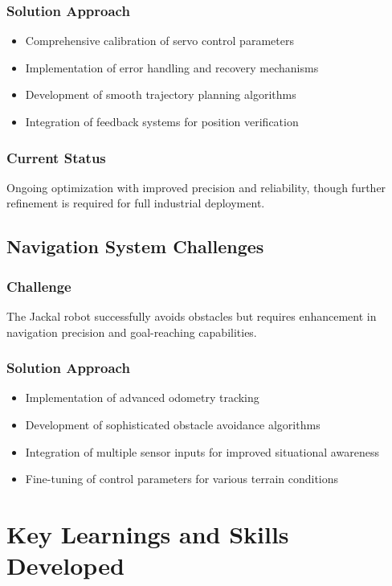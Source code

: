 \documentclass[12pt]{article}
\begin{document}
\subsubsection{Solution Approach}
\begin{itemize}
\item Comprehensive calibration of servo control parameters
\item Implementation of error handling and recovery mechanisms
\item Development of smooth trajectory planning algorithms
\item Integration of feedback systems for position verification
\end{itemize}

\subsubsection{Current Status}
Ongoing optimization with improved precision and reliability, though further refinement is required for full industrial deployment.

\subsection{Navigation System Challenges}
\subsubsection{Challenge}
The Jackal robot successfully avoids obstacles but requires enhancement in navigation precision and goal-reaching capabilities.

\subsubsection{Solution Approach}
\begin{itemize}
\item Implementation of advanced odometry tracking
\item Development of sophisticated obstacle avoidance algorithms
\item Integration of multiple sensor inputs for improved situational awareness
\item Fine-tuning of control parameters for various terrain conditions
\end{itemize}

\newpage

\section{Key Learnings and Skills Developed}
\end{document}
